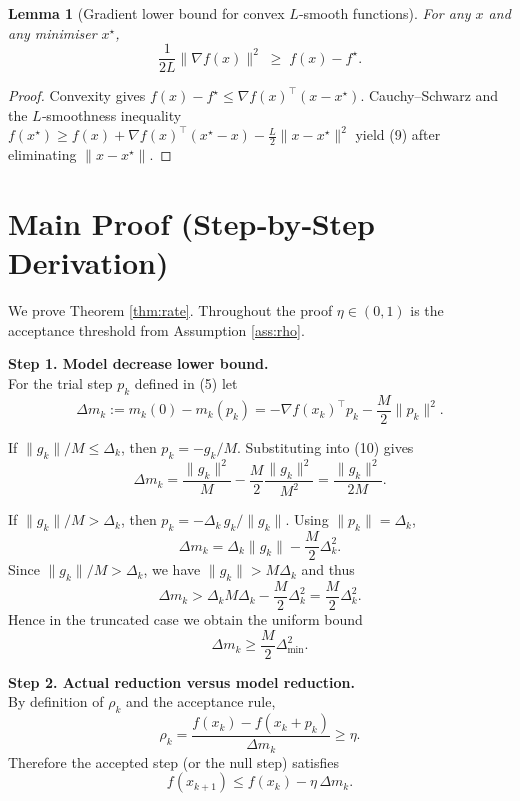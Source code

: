 \documentclass{article}
\newtheorem{lemma}{Lemma}
\begin{document}
\begin{lemma}[Gradient lower bound for convex $L$‑smooth functions]\label{lem:gradlb}
For any $x$ and any minimiser $x^\star$,
\[
\frac{1}{2L}\|\nabla f(x)\|^{2}\;\ge\; f(x)-f^\star .
\tag{9}
\]
\end{lemma}
\begin{proof}
Convexity gives $f(x)-f^\star\le \nabla f(x)^{\!\top}(x-x^\star)$.
Cauchy–Schwarz and the $L$‑smoothness inequality
$f(x^\star)\ge f(x)+\nabla f(x)^{\!\top}(x^\star-x)-\frac{L}{2}\|x-x^\star\|^{2}$
yield (9) after eliminating $\|x-x^\star\|$.
\end{proof}

\section*{Main Proof (Step‑by‑Step Derivation)}
We prove Theorem \ref{thm:rate}.  Throughout the proof
$\eta\in(0,1)$ is the acceptance threshold from Assumption \ref{ass:rho}.

\noindent\textbf{Step 1. Model decrease lower bound.}\\
For the trial step $p_k$ defined in (5) let
\[
\Delta m_k:=m_k(0)-m_k(p_k)
            =-\nabla f(x_k)^{\!\top}p_k-\frac{M}{2}\|p_k\|^{2}.
\tag{10}
\]

\begin{enumerate}[label=\textbf{[Step \arabic*]}]
\item \label{step:undercut}
If $\|g_k\|/M\le\Delta_k$, then $p_k=-g_k/M$.
Substituting into (10) gives
\[
\Delta m_k
   =\frac{\|g_k\|^{2}}{M}-\frac{M}{2}\frac{\|g_k\|^{2}}{M^{2}}
   =\frac{\|g_k\|^{2}}{2M}.
\tag{11}
\]

\item \label{step:cut}
If $\|g_k\|/M>\Delta_k$, then $p_k=-\Delta_k\,g_k/\|g_k\|$.
Using $\|p_k\|=\Delta_k$,
\[
\Delta m_k
   =\Delta_k\|g_k\|-\frac{M}{2}\Delta_k^{2}.
\tag{12}
\]
Since $\|g_k\|/M>\Delta_k$, we have $\|g_k\|>M\Delta_k$ and thus
\[
\Delta m_k
   >\Delta_k M\Delta_k-\frac{M}{2}\Delta_k^{2}
   =\frac{M}{2}\Delta_k^{2}.
\tag{13}
\]
Hence in the truncated case we obtain the uniform bound
\[
\Delta m_k\ge\frac{M}{2}\Delta_{\min}^{2}.
\tag{14}
\]
\end{enumerate}

\noindent\textbf{Step 2. Actual reduction versus model reduction.}\\
By definition of $\rho_k$ and the acceptance rule,
\[
\rho_k=\frac{f(x_k)-f(x_k+p_k)}{\Delta m_k}\ge\eta .
\tag{15}
\]
Therefore the accepted step (or the null step) satisfies
\[
f(x_{k+1})\le f(x_k)-\eta\,\Delta m_k .
\tag{16}
\]
\end{document}
